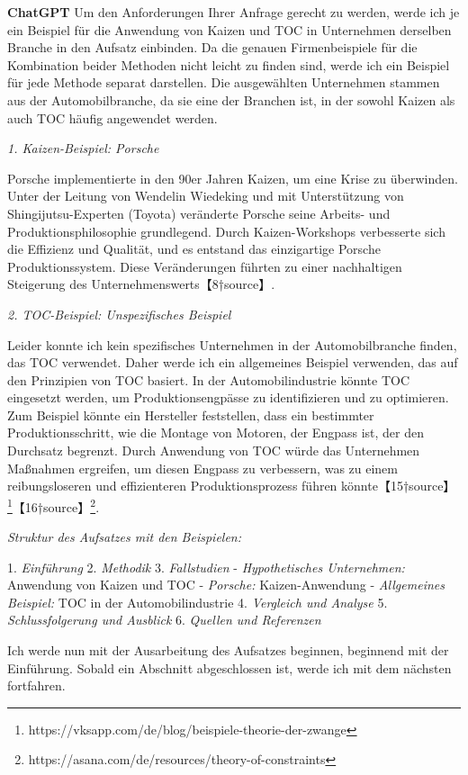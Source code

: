 \textbf{ChatGPT}
Um den Anforderungen Ihrer Anfrage gerecht zu werden, werde ich je ein Beispiel für die Anwendung von Kaizen und TOC in Unternehmen derselben Branche in den Aufsatz einbinden. Da die genauen Firmenbeispiele für die Kombination beider Methoden nicht leicht zu finden sind, werde ich ein Beispiel für jede Methode separat darstellen. Die ausgewählten Unternehmen stammen aus der Automobilbranche, da sie eine der Branchen ist, in der sowohl Kaizen als auch TOC häufig angewendet werden.

\textit{1. Kaizen-Beispiel: Porsche}

Porsche implementierte in den 90er Jahren Kaizen, um eine Krise zu überwinden. Unter der Leitung von Wendelin Wiedeking und mit Unterstützung von Shingijutsu-Experten (Toyota) veränderte Porsche seine Arbeits- und Produktionsphilosophie grundlegend. Durch Kaizen-Workshops verbesserte sich die Effizienz und Qualität, und es entstand das einzigartige Porsche Produktionssystem. Diese Veränderungen führten zu einer nachhaltigen Steigerung des Unternehmenswerts【8†source】.

\textit{2. TOC-Beispiel: Unspezifisches Beispiel}

Leider konnte ich kein spezifisches Unternehmen in der Automobilbranche finden, das TOC verwendet. Daher werde ich ein allgemeines Beispiel verwenden, das auf den Prinzipien von TOC basiert. In der Automobilindustrie könnte TOC eingesetzt werden, um Produktionsengpässe zu identifizieren und zu optimieren. Zum Beispiel könnte ein Hersteller feststellen, dass ein bestimmter Produktionsschritt, wie die Montage von Motoren, der Engpass ist, der den Durchsatz begrenzt. Durch Anwendung von TOC würde das Unternehmen Maßnahmen ergreifen, um diesen Engpass zu verbessern, was zu einem reibungsloseren und effizienteren Produktionsprozess führen könnte【15†source】\footnote{https://vksapp.com/de/blog/beispiele-theorie-der-zwange}【16†source】\footnote{https://asana.com/de/resources/theory-of-constraints}.

\textit{Struktur des Aufsatzes mit den Beispielen:}

1. \textit{Einführung}
2. \textit{Methodik}
3. \textit{Fallstudien}
- \textit{Hypothetisches Unternehmen:} Anwendung von Kaizen und TOC
- \textit{Porsche:} Kaizen-Anwendung
- \textit{Allgemeines Beispiel:} TOC in der Automobilindustrie
4. \textit{Vergleich und Analyse}
5. \textit{Schlussfolgerung und Ausblick}
6. \textit{Quellen und Referenzen}

Ich werde nun mit der Ausarbeitung des Aufsatzes beginnen, beginnend mit der Einführung. Sobald ein Abschnitt abgeschlossen ist, werde ich mit dem nächsten fortfahren.

